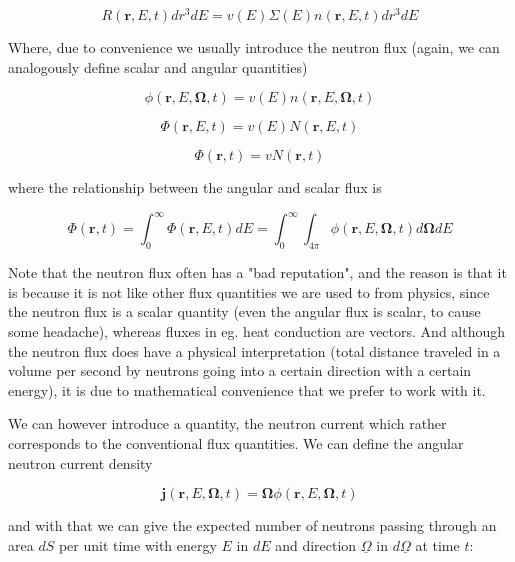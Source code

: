 \begin{equation}
R(\mathbf{r},E,t)dr^3dE=v(E)\Sigma(E) n(\mathbf{r},E,t)dr^3dE
\end{equation}

Where, due to convenience we usually introduce the neutron flux (again, we can analogously define scalar and angular quantities)

\begin{equation}
\phi(\mathbf{r},E,\mathbf{\Omega},t)=v(E)n(\mathbf{r},E,\mathbf{\Omega},t)
\end{equation}

\begin{equation*}
\Phi(\mathbf{r},E,t)=v(E)N(\mathbf{r},E,t)
\end{equation*}

\begin{equation*}
\Phi(\mathbf{r},t)=vN(\mathbf{r},t)
\end{equation*}

\noindent where the relationship between the angular and scalar flux is

$$\Phi(\mathbf{r},t)=\int^\infty_0\Phi(\mathbf{r},E,t)dE=\int^\infty_0\int_{4\pi}\phi(\mathbf{r},E,\mathbf{\Omega},t)d\mathbf{\Omega}dE$$

Note that the neutron flux often has a "bad reputation", and the reason is that it is because it is not like other flux quantities we are used to from physics, since the neutron flux is a scalar quantity (even the angular flux is scalar, to cause some headache), whereas fluxes in eg. heat conduction are vectors. And although the neutron flux does have a physical interpretation (total distance traveled in a volume per second by neutrons going into a certain direction with a certain energy), it is due to mathematical convenience that we prefer to work with it. 

We can however introduce a quantity, the neutron current which rather corresponds to the conventional flux quantities. We can define the angular neutron current density

\begin{equation}
\mathbf{j}(\mathbf{r},E,\mathbf{\Omega},t)=\mathbf{\Omega}\phi(\mathbf{r},E,\mathbf{\Omega},t)
\end{equation}

\noindent and with that we can give the expected number of neutrons passing through an area $dS$ per unit time with energy $E$ in $dE$ and direction $\underline\Omega$ in $d\underline\Omega$ at time $t$:

